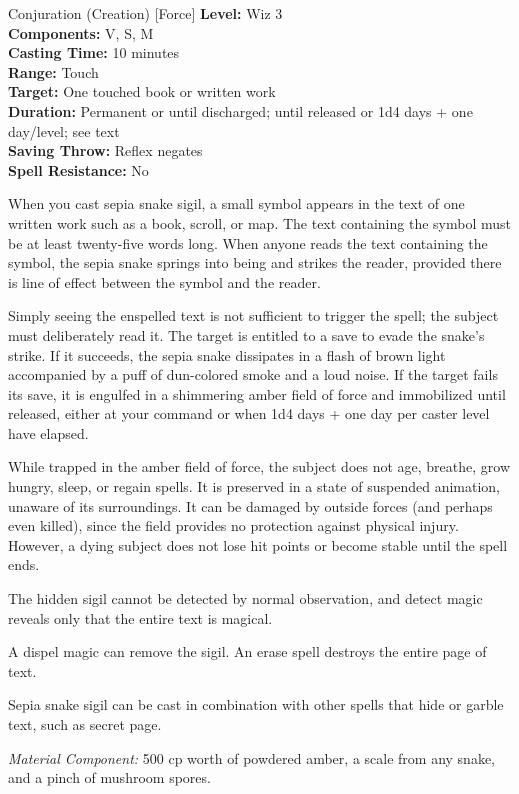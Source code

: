 {Conjuration (Creation) [Force]}
{
	\textbf{Level:}
	Wiz 3\\
	\textbf{Components:}
	V, S, M\\
	\textbf{Casting Time:}
	10 minutes\\
	\textbf{Range:}
	Touch\\
	\textbf{Target:}
	One touched book or written work\\
	\textbf{Duration:}
	Permanent or until discharged; until released or 1d4 days + one day/level; see text\\
	\textbf{Saving Throw:}
	Reflex negates\\
	\textbf{Spell Resistance:}
	No\\
}
{
	When you cast sepia snake sigil, a small symbol appears in the text of one written work such as a book, scroll, or map. The text containing the symbol must be at least twenty-five words long. When anyone reads the text containing the symbol, the sepia snake springs into being and strikes the reader, provided there is line of effect between the symbol and the reader.

	Simply seeing the enspelled text is not sufficient to trigger the spell; the subject must deliberately read it. The target is entitled to a save to evade the snake's strike. If it succeeds, the sepia snake dissipates in a flash of brown light accompanied by a puff of dun-colored smoke and a loud noise. If the target fails its save, it is engulfed in a shimmering amber field of force and immobilized until released, either at your command or when 1d4 days + one day per caster level have elapsed.

	While trapped in the amber field of force, the subject does not age, breathe, grow hungry, sleep, or regain spells. It is preserved in a state of suspended animation, unaware of its surroundings. It can be damaged by outside forces (and perhaps even killed), since the field provides no protection against physical injury. However, a dying subject does not lose hit points or become stable until the spell ends.

	The hidden sigil cannot be detected by normal observation, and detect magic reveals only that the entire text is magical.

	A dispel magic can remove the sigil. An erase spell destroys the entire page of text.

	Sepia snake sigil can be cast in combination with other spells that hide or garble text, such as secret page.

	\textit{Material Component:}
	500 cp worth of powdered amber, a scale from any snake, and a pinch of mushroom spores.

}
